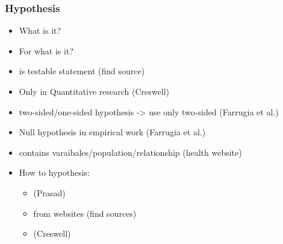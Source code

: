 \subsubsection{Hypothesis}

\begin{itemize}
	\item What is it?
	\item For what is it?
	\item is testable statement  {\color{red} (find source)}
	\item Only in Quantitative research  {\color{red} (Creswell)}
	\item two-sided/one-sided hypothesis -> use only two-sided  {\color{red} (Farrugia et al.)}
	\item Null hypothesis in empirical work  {\color{red} (Farrugia et al.)}
	\item contains varaibales/population/relationship  {\color{red} (health website)}
	\item How to hypothesis:
	\begin{itemize}
		\item  {\color{red} (Prasad)}
		\item from websites  {\color{red} (find sources)}
		\item  {\color{red} (Creswell)}
	\end{itemize}
\end{itemize}